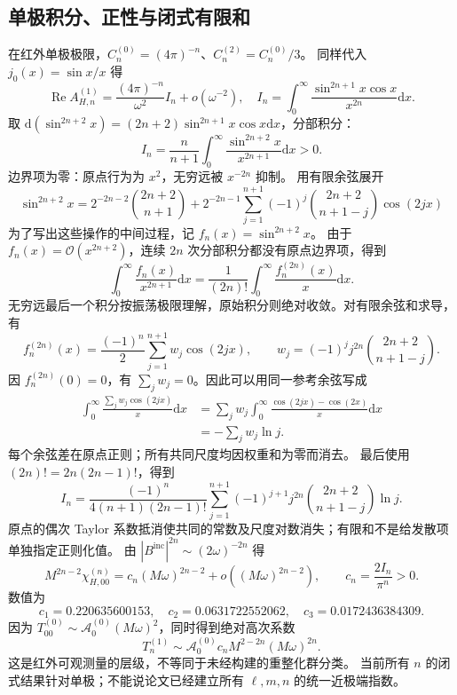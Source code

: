 \documentclass[UTF8,fontset=fandol,11pt,a4paper]{ctexart}
\newcommand{\dd}{\mathrm{d}}
\newcommand{\Rea}{\operatorname{Re}}
\newcommand{\Bin}{B^{\mathrm{inc}}}
\newcommand{\calO}{\mathcal O}
\numberwithin{equation}{section}
\begin{document}
\subsection{单极积分、正性与闭式有限和}
在红外单极极限，$C_n^{(0)}=(4\pi)^{-n}$、$C_n^{(2)}=C_n^{(0)}/3$。
同样代入 $j_0(x)=\sin x/x$ 得
\begin{equation}
\Rea A_{H,n}^{(1)}=\frac{(4\pi)^{-n}}{\omega^2}I_n+o(\omega^{-2}),\quad
I_n=\int_0^\infty\frac{\sin^{2n+1}x\cos x}{x^{2n}}\dd x.
\end{equation}
取 $\dd(\sin^{2n+2}x)=(2n+2)\sin^{2n+1}x\cos x\dd x$，分部积分：
\begin{equation}
I_n=\frac{n}{n+1}\int_0^\infty\frac{\sin^{2n+2}x}{x^{2n+1}}\dd x>0.
\end{equation}
边界项为零：原点行为为 $x^2$，无穷远被 $x^{-2n}$ 抑制。
用有限余弦展开
\begin{equation}
\sin^{2n+2}x=2^{-2n-2}\binom{2n+2}{n+1}
+2^{-2n-1}\sum_{j=1}^{n+1}(-1)^j\binom{2n+2}{n+1-j}\cos(2jx)
\end{equation}
为了写出这些操作的中间过程，记 $f_n(x)=\sin^{2n+2}x$。
由于 $f_n(x)=\calO(x^{2n+2})$，连续 $2n$ 次分部积分都没有原点边界项，得到
\begin{equation}
\int_0^\infty\frac{f_n(x)}{x^{2n+1}}\dd x
=\frac1{(2n)!}\int_0^\infty\frac{f_n^{(2n)}(x)}x\dd x.
\end{equation}
无穷远最后一个积分按振荡极限理解，原始积分则绝对收敛。对有限余弦和求导，有
\begin{equation}
f_n^{(2n)}(x)=\frac{(-1)^n}{2}\sum_{j=1}^{n+1}w_j\cos(2jx),\qquad
w_j=(-1)^j j^{2n}\binom{2n+2}{n+1-j}.
\end{equation}
因 $f_n^{(2n)}(0)=0$，有 $\sum_jw_j=0$。因此可以用同一参考余弦写成
\begin{align}
\int_0^\infty\frac{\sum_jw_j\cos(2jx)}x\dd x
&=\sum_jw_j\int_0^\infty\frac{\cos(2jx)-\cos(2x)}x\dd x\nonumber\\
&=-\sum_jw_j\ln j.
\end{align}
每个余弦差在原点正则；所有共同尺度均因权重和为零而消去。
最后使用 $(2n)!=2n(2n-1)!$，得到
\begin{equation}
I_n=\frac{(-1)^n}{4(n+1)(2n-1)!}
\sum_{j=1}^{n+1}(-1)^{j+1}j^{2n}\binom{2n+2}{n+1-j}\ln j.
\end{equation}
原点的偶次 Taylor 系数抵消使共同的常数及尺度对数消失；有限和不是给发散项单独指定正则化值。
由 $|\Bin|^{2n}\sim(2\omega)^{-2n}$ 得
\begin{equation}
\boxed{M^{2n-2}\chi_{H,00}^{(n)}=c_n(M\omega)^{2n-2}
+o((M\omega)^{2n-2}),\qquad c_n=\frac{2I_n}{\pi^n}>0.}
\end{equation}
数值为
\begin{equation}
c_1=0.220635600153,\quad c_2=0.0631722552062,\quad c_3=0.0172436384309.
\end{equation}
因为 $T^{(0)}_{00}\sim\mathcal A_0^{(0)}(M\omega)^2$，同时得到绝对高次系数
\begin{equation}
T_n^{(1)}\sim\mathcal A_0^{(0)}c_n M^{2-2n}(M\omega)^{2n}.
\end{equation}
这是红外可观测量的层级，不等同于未经构建的重整化群分类。
当前所有 $n$ 的闭式结果针对单极；不能说论文已经建立所有 $\ell,m,n$ 的统一近极端指数。
\end{document}
